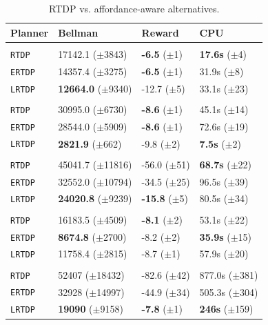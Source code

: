 \documentclass[letterpaper]{article}
\newcommand{\ra}[1]{\renewcommand{\arraystretch}{#1}} %
\begin{document}
\begin{table}[t]
\ra{1.15}
\small
\begin{tabular}{@{}llll@{}}\toprule
Planner & Bellman & Reward & CPU \\ \midrule
&\hspace{-10mm}{\it Mining Task} \\
\texttt{RTDP} & 17142.1 ($\pm$3843) 		& {\bf -6.5} ($\pm$1)  & {\bf 17.6s}   ($\pm$4) \\
\texttt{ERTDP} 	& 14357.4 ($\pm$3275) 		& {\bf -6.5}   ($\pm$1) & 31.9s   ($\pm$8) \\
\texttt{LRTDP} 	& {\bf 12664.0} ($\pm$9340) 	& -12.7 ($\pm$5) & 33.1s   ($\pm$23) \\\hline
&\hspace{-10mm}{\it Smelting Task} \\
\texttt{RTDP} 	& 30995.0 ($\pm$6730) 		& {\bf -8.6}   ($\pm$1) & 45.1s   ($\pm$14) \\
\texttt{ERTDP} 	& 28544.0 ($\pm$5909) 		& {\bf -8.6}   ($\pm$1) & 72.6s   ($\pm$19) \\ 
\texttt{LRTDP} 	& {\bf 2821.9} 	 ($\pm$662) 	& -9.8   ($\pm$2) & {\bf 7.5s}  ($\pm$2) \\ \hline
&\hspace{-10mm}{\it Wall Traversal Task} \\
\texttt{RTDP} & 45041.7 ($\pm$11816) 		& -56.0   ($\pm$51) & {\bf 68.7s}   ($\pm$22) \\
\texttt{ERTDP} 	& 32552.0 ($\pm$10794) 		& -34.5   ($\pm$25) & 96.5s   ($\pm$39) \\ 
\texttt{LRTDP} 	& {\bf 24020.8} ($\pm$9239) 	& {\bf -15.8}   ($\pm$5) & 80.5s   ($\pm$34) \\ \hline
&\hspace{-10mm}{\it Trench Traversal Task} \\
\texttt{RTDP}  	& 16183.5 ($\pm$4509) 		& {\bf -8.1}   ($\pm$2) & 53.1s   ($\pm$22) \\
\texttt{ERTDP} 	& {\bf 8674.8} 	($\pm$2700) 	& -8.2   ($\pm$2) & {\bf 35.9s}   ($\pm$15) \\ 
\texttt{LRTDP} 	& 11758.4 ($\pm$2815) 		& -8.7   ($\pm$1) & 57.9s   ($\pm$20) \\ \hline
&\hspace{-10mm}{\it Plane Traversal Task} \\
\texttt{RTDP} & 52407 ($\pm$18432) 		& -82.6   ($\pm$42) & 877.0s   ($\pm$381) \\
\texttt{ERTDP} 	& 32928 ($\pm$14997) 		& -44.9   ($\pm$34) & 505.3s   ($\pm$304) \\
\texttt{LRTDP} 	& {\bf 19090} 	 ($\pm$9158) 	& {\bf-7.8}   ($\pm$1) & {\bf 246s}  ($\pm$159) \\
\bottomrule
\end{tabular}
\caption{RTDP vs. affordance-aware alternatives.}
\label{table:minecraft_results}
\end{table}
\end{document}

